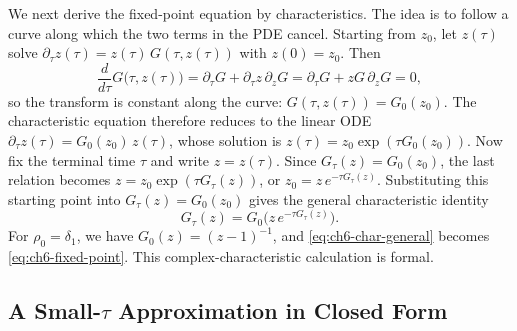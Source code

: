 \begin{proofsketch}
We next derive the fixed-point equation by characteristics. The idea is to follow a curve along which the two terms in the PDE cancel. Starting from $z_0$, let $z(\tau)$ solve $\partial_\tau z(\tau) = z(\tau)\,G(\tau, z(\tau))$ with $z(0) = z_0$. Then
\begin{equation}
\label{eq:ch6-char-const}
\frac{d}{d\tau} G\bigl(\tau, z(\tau)\bigr) = \partial_\tau G + \partial_\tau z\,\partial_z G = \partial_\tau G + z G\,\partial_z G = 0,
\end{equation}
so the transform is constant along the curve: $G(\tau, z(\tau)) = G_0(z_0)$. The characteristic equation therefore reduces to the linear ODE $\partial_\tau z(\tau) = G_0(z_0)\,z(\tau)$, whose solution is $z(\tau) = z_0 \exp(\tau G_0(z_0))$. Now fix the terminal time $\tau$ and write $z = z(\tau)$. Since $G_\tau(z) = G_0(z_0)$, the last relation becomes $z = z_0 \exp(\tau G_\tau(z))$, or $z_0 = z\,e^{-\tau G_\tau(z)}$. Substituting this starting point into $G_\tau(z) = G_0(z_0)$ gives the general characteristic identity
\begin{equation}
\label{eq:ch6-char-general}
G_\tau(z) = G_0\bigl(z\,e^{-\tau G_\tau(z)}\bigr).
\end{equation}
For $\rho_0 = \delta_1$, we have $G_0(z) = (z - 1)^{-1}$, and \eqref{eq:ch6-char-general} becomes \eqref{eq:ch6-fixed-point}. This complex-characteristic calculation is formal.
\end{proofsketch}

\subsection{A Small-\texorpdfstring{$\tau$}{tau} Approximation in Closed Form}
\label{subsec:small-tau}

